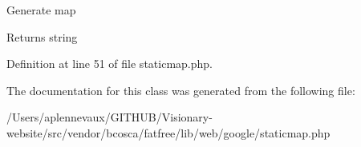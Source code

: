 Generate map \begin{DoxyReturn}{Returns}
string 
\end{DoxyReturn}


Definition at line 51 of file staticmap.\+php.



The documentation for this class was generated from the following file\+:\begin{DoxyCompactItemize}
\item 
/\+Users/aplennevaux/\+G\+I\+T\+H\+U\+B/\+Visionary-\/website/src/vendor/bcosca/fatfree/lib/web/google/staticmap.\+php\end{DoxyCompactItemize}
